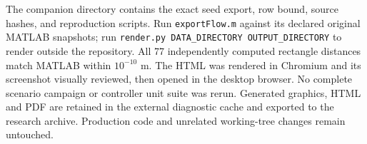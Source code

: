 \documentclass[11pt]{article}
\begin{document}
The companion directory 
contains the exact seed export, row bound, source hashes, and reproduction
scripts. Run \texttt{exportFlow.m} against its declared original MATLAB
snapshots; run \texttt{render.py DATA\_DIRECTORY OUTPUT\_DIRECTORY} to render
outside the repository. All 77 independently computed rectangle distances
match MATLAB within $10^{-10}$ m. The HTML was rendered in Chromium and its
screenshot visually reviewed, then opened in the desktop browser. No complete
scenario campaign or controller unit suite was rerun. Generated graphics,
HTML and PDF are retained in the external diagnostic cache and exported to
the research archive. Production code and unrelated working-tree changes
remain untouched.
\end{document}
